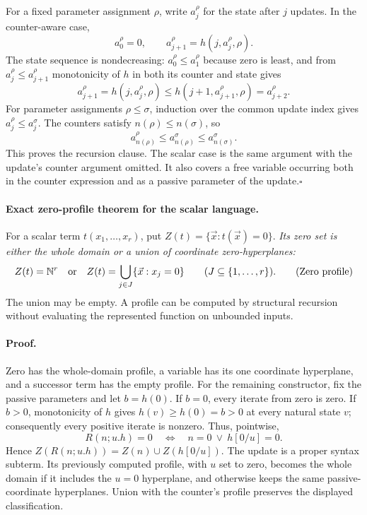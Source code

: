 For a fixed parameter assignment $\rho$, write $a_j^\rho$ for the state
after $j$ updates. In the counter-aware case,
\[
 a_0^\rho=0,\qquad
 a_{j+1}^\rho=h(j,a_j^\rho,\rho).
\]
The state sequence is nondecreasing: $a_0^\rho\le a_1^\rho$ because
zero is least, and from $a_j^\rho\le a_{j+1}^\rho$ monotonicity of
$h$ in both its counter and state gives
\[
 a_{j+1}^\rho=h(j,a_j^\rho,\rho)
 \le h(j+1,a_{j+1}^\rho,\rho)=a_{j+2}^\rho.
\]
For parameter assignments $\rho\le\sigma$, induction over the common
update index gives $a_j^\rho\le a_j^\sigma$. The counters satisfy
$n(\rho)\le n(\sigma)$, so
\[
 a_{n(\rho)}^\rho
 \le a_{n(\rho)}^\sigma
 \le a_{n(\sigma)}^\sigma.
\]
This proves the recursion clause. The scalar case is the same argument
with the update's counter argument omitted. It also covers a free
variable occurring both in the counter expression and as a passive
parameter of the update.\hfill$\square$

\paragraph{Exact zero-profile theorem for the scalar language.}
For a scalar term $t(x_1,\ldots,x_r)$, put
$Z(t)=\{\vec x:t(\vec x)=0\}$.
\emph{Its zero set is either the whole domain or a union of coordinate
zero-hyperplanes:}
\[
 Z(t)=\mathbb N^r
 \quad\hbox{or}\quad
 Z(t)=\bigcup_{j\in J}\{\vec x:x_j=0\}
 \qquad(J\subseteq\{1,\ldots,r\}).
 \tag{Zero profile}
\]
The union may be empty. A profile can be computed by structural recursion
without evaluating the represented function on unbounded inputs.

\paragraph{Proof.}
Zero has the whole-domain profile, a variable has its one coordinate
hyperplane, and a successor term has the empty profile. For the remaining
constructor, fix the passive parameters and let $b=h(0)$. If $b=0$,
every iterate from zero is zero. If $b>0$, monotonicity of $h$ gives
$h(v)\ge h(0)=b>0$ at every natural state $v$; consequently every
positive iterate is nonzero. Thus, pointwise,
\[
 R(n;u.h)=0
 \quad\Longleftrightarrow\quad
 n=0\ \lor\ h[0/u]=0.
 \tag{Zero recurrence}
\]
Hence $Z(R(n;u.h))=Z(n)\cup Z(h[0/u])$. The update is a proper syntax
subterm. Its previously computed profile, with $u$ set to zero, becomes
the whole domain if it includes the $u=0$ hyperplane, and otherwise keeps
the same passive-coordinate hyperplanes. Union with the counter's
profile preserves the displayed classification.

